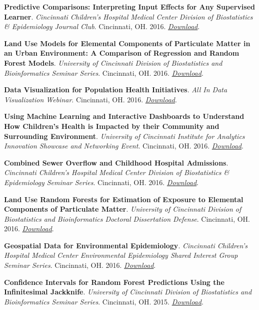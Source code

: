 \textbf{Predictive Comparisons: Interpreting Input Effects for Any
Supervised Learner}. \emph{Cincinnati Children's Hospital Medical Center
Division of Biostatistics \& Epidemiology Journal Club}. Cincinnati, OH.
2016.
\href{http://colebrokamp-website.s3.amazonaws.com/talks/APC_talk.pdf}{\emph{Download}}.

\textbf{Land Use Models for Elemental Components of Particulate Matter
in an Urban Environment: A Comparison of Regression and Random Forest
Models}. \emph{University of Cincinnati Division of Biostatistics and
Bioinformatics Seminar Series}. Cincinnati, OH. 2016.
\href{http://colebrokamp-website.s3.amazonaws.com/talks/LUR_vs_LURF_Cole_Brokamp.pdf}{\emph{Download}}.

\textbf{Data Visualization for Population Health Initiatives}. \emph{All
In Data Visualization Webinar}. Cincinnati, OH. 2016.
\href{http://colebrokamp-website.s3.amazonaws.com/talks/all_in_webinar_Beck_Brokamp.pdf}{\emph{Download}}.

\textbf{Using Machine Learning and Interactive Dashboards to Understand
How Children's Health is Impacted by their Community and Surrounding
Environment}. \emph{University of Cincinnati Institute for Analytics
Innovation Showcase and Networking Event}. Cincinnati, OH. 2016.
\href{http://colebrokamp-website.s3.amazonaws.com/talks/data_analytics_showcase_cole_brokamp.pdf}{\emph{Download}}.

\textbf{Combined Sewer Overflow and Childhood Hospital Admissions}.
\emph{Cincinnati Children's Hospital Medical Center Division of
Biostatistics \& Epidemiology Seminar Series}. Cincinnati, OH. 2016.
\href{http://colebrokamp-website.s3.amazonaws.com/talks/Combined\%20Sewer\%20Overflow\%20and\%20Hospital\%20Admissions.pdf}{\emph{Download}}.

\textbf{Land Use Random Forests for Estimation of Exposure to Elemental
Components of Particulate Matter}. \emph{University of Cincinnati
Division of Biostatistics and Bioinformatics Doctoral Dissertation
Defense}. Cincinnati, OH. 2016.
\href{http://colebrokamp-website.s3.amazonaws.com/talks/Cole\%20Brokamp\%20Dissertation\%20Defense\%2023March2016.pdf}{\emph{Download}}.

\textbf{Geospatial Data for Environmental Epidemiology}.
\emph{Cincinnati Children's Hospital Medical Center Environmental
Epidemiology Shared Interest Group Seminar Series}. Cincinnati, OH.
2016.
\href{http://colebrokamp-website.s3.amazonaws.com/talks/GIS_env_epi.pdf}{\emph{Download}}.

\textbf{Confidence Intervals for Random Forest Predictions Using the
Infinitesimal Jackknife}. \emph{University of Cincinnati Division of
Biostatistics and Bioinformatics Seminar Series}. Cincinnati, OH. 2015.
\href{http://colebrokamp-website.s3.amazonaws.com/talks/Confidence_Intervals_for_Random_Forest_Predictions_Using_the_Infinitesimal_Jackknife.pdf}{\emph{Download}}.


